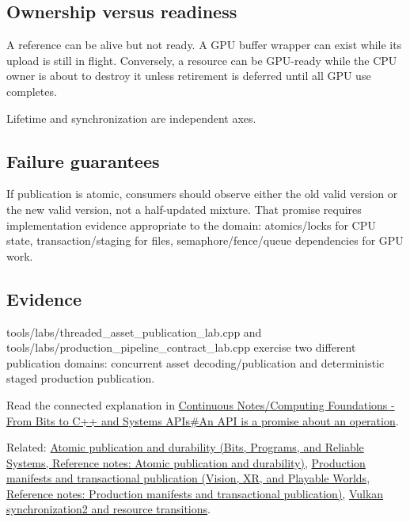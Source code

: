 \subsection{Ownership versus readiness}\label{appendix-fdae7ff0a23f-ownership-versus-readiness}

A reference can be alive but not ready. A GPU buffer wrapper can exist while its upload is still in flight. Conversely, a resource can be GPU-ready while the CPU owner is about to destroy it unless retirement is deferred until all GPU use completes.

Lifetime and synchronization are independent axes.

\subsection{Failure guarantees}\label{appendix-fdae7ff0a23f-failure-guarantees}

If publication is atomic, consumers should observe either the old valid version or the new valid version, not a half-updated mixture. That promise requires implementation evidence appropriate to the domain: atomics/locks for CPU state, transaction/staging for files, semaphore/fence/queue dependencies for GPU work.

\subsection{Evidence}\label{appendix-fdae7ff0a23f-evidence}

tools/labs/threaded\_asset\_publication\_lab.cpp and tools/labs/production\_pipeline\_contract\_lab.cpp exercise two different publication domains: concurrent asset decoding/publication and deterministic staged production publication.

Read the connected explanation in \hyperref[01-foundations-i-ch008-an-api-is-a-promise-about-an-operation]{Continuous Notes/Computing Foundations - From Bits to C++ and Systems APIs\#An API is a promise about an operation}.

Related: \href{../01-Bits-Programs-and-Reliable-Systems/main.pdf\#nameddest=appendix-e89a8f290ef5}{Atomic publication and durability (Bits, Programs, and Reliable Systems, Reference notes: Atomic publication and durability)}, \href{../07-Vision-XR-and-Playable-Worlds/main.pdf\#nameddest=appendix-91eaa3cbdbc3}{Production manifests and transactional publication (Vision, XR, and Playable Worlds, Reference notes: Production manifests and transactional publication)}, \hyperref[appendix-f15ce0d9c170]{Vulkan synchronization2 and resource transitions}.
